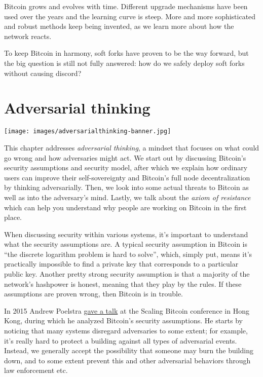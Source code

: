 Bitcoin grows and evolves with time. Different upgrade mechanisms have
been used over the years and the learning curve is steep. More and more
sophisticated and robust methods keep being invented, as we learn more
about how the network reacts.

To keep Bitcoin in harmony, soft forks have proven to be the way
forward, but the big question is still not fully answered: how do we
safely deploy soft forks without causing discord?

\hypertarget{adversarialthinking}{%
\section{Adversarial thinking}\label{adversarialthinking}}

\texttt{[image: images/adversarialthinking-banner.jpg]}

This chapter addresses \emph{adversarial thinking}, a mindset that
focuses on what could go wrong and how adversaries might act. We start
out by discussing Bitcoin's security assumptions and security model,
after which we explain how ordinary users can improve their
self-sovereignty and Bitcoin's full node decentralization by thinking
adversarially. Then, we look into some actual threats to Bitcoin as well
as into the adversary's mind. Lastly, we talk about the \emph{axiom of
resistance} which can help you understand why people are working on
Bitcoin in the first place.

When discussing security within various systems, it's important to
understand what the security assumptions are. A typical security
assumption in Bitcoin is ``the discrete logarithm problem is hard to
solve'', which, simply put, means it's practically impossible to find a
private key that corresponds to a particular public key. Another pretty
strong security assumption is that a majority of the network's hashpower
is honest, meaning that they play by the rules. If these assumptions are
proven wrong, then Bitcoin is in trouble.

In 2015 Andrew Poelstra
\href{https://btctranscripts.com/scalingbitcoin/hong-kong-2015/security-assumptions/}{gave
a talk} at the Scaling Bitcoin conference in Hong Kong, during which he
analyzed Bitcoin's security assumptions. He starts by noticing that many
systems disregard adversaries to some extent; for example, it's really
hard to protect a building against all types of adversarial events.
Instead, we generally accept the possibility that someone may burn the
building down, and to some extent prevent this and other adversarial
behaviors through law enforcement etc.

